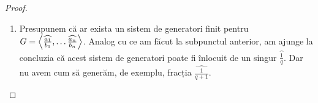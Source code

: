 \begin{proof}
\begin{enumerate}
    \item Presupunem că ar exista un sistem de generatori finit pentru \(G = \left\langle \widehat{\frac{a_1}{b_1}}, \dots \widehat{\frac{a_n}{b_n}} \right\rangle\). Analog cu ce am făcut la subpunctul anterior, am ajunge la concluzia că acest sistem de generatori poate fi înlocuit de un singur \(\widehat{\frac{1}{q}}\). Dar nu avem cum să generăm, de exemplu, fracția \(\widehat{\frac{1}{q + 1}}\).
\end{enumerate}
\end{proof}
